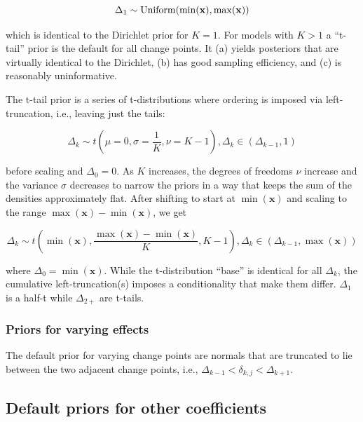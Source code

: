 \documentclass[
  american,
]{article}
\begin{document}
\begin{equation}
\Delta_1 \sim {\rm Uniform}(\min(\mathbf{x}), \max(\mathbf{x}))
\end{equation}

which is identical to the Dirichlet prior for \(K = 1\). For models with \(K > 1\) a ``t-tail'' prior is the default for all change points. It (a) yields posteriors that are virtually identical to the Dirichlet, (b) has good sampling efficiency, and (c) is reasonably uninformative.

The t-tail prior is a series of t-distributions where ordering is imposed via left-truncation, i.e., leaving just the tails:

\begin{equation}
\Delta_k \sim t(\mu = 0, \sigma = \frac{1}{K}, \nu = K-1), \Delta_k \in (\Delta_{k-1}, 1)
\end{equation}

before scaling and \(\Delta_0 = 0\). As \(K\) increases, the degrees of freedoms \(\nu\) increase and the variance \(\sigma\) decreases to narrow the priors in a way that keeps the sum of the densities approximately flat. After shifting to start at \(\min(\mathbf{x})\) and scaling to the range \(\max(\mathbf{x}) - \min(\mathbf{x})\), we get

\begin{equation}
\Delta_k \sim t(\min(\mathbf{x}), \frac{\max(\mathbf{x}) - \min(\mathbf{x})}{K}, K-1), \Delta_k \in (\Delta_{k-1}, \max(\mathbf{x}))
\end{equation}

where \(\Delta_0 = \min(\mathbf{x})\). While the t-distribution ``base'' is identical for all \(\Delta_k\), the cumulative left-truncation(s) imposes a conditionality that make them differ. \(\Delta_1\) is a half-t while \(\Delta_{2+}\) are t-tails.

\hypertarget{priors-for-varying-effects}{%
\subsubsection{Priors for varying effects}\label{priors-for-varying-effects}}

The default prior for varying change points are normals that are truncated to lie between the two adjacent change points, i.e., \(\Delta_{k-1} < \delta_{k, j} < \Delta_{k + 1}\).

\hypertarget{default-priors-for-other-coefficients}{%
\subsection{Default priors for other coefficients}\label{default-priors-for-other-coefficients}}
\end{document}
